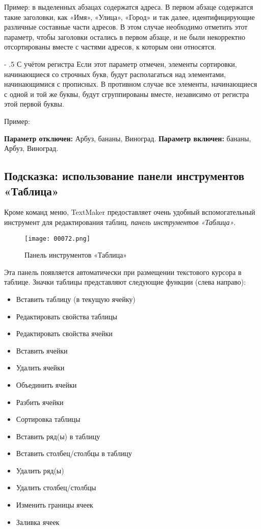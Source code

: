 ﻿\documentclass[a4paper,10pt]{article}
\makeatletter
\renewcommand\paragraph{%
   \@startsection{paragraph}{4}{0mm}%
      {-\baselineskip}%
      {.5\baselineskip}%
      {\normalfont\normalsize\bfseries}}
\makeatother
\begin{document}
Пример: в выделенных абзацах содержатся адреса. В первом абзаце содержатся такие заголовки, как «Имя», «Улица», «Город» и так далее, идентифицирующие различные составные части адресов. В этом случае необходимо отметить этот параметр, чтобы заголовки остались в первом абзаце, и не были некорректно отсортированы вместе с частями адресов, к которым они относятся.

\paragraph{С учётом регистра}
Если этот параметр отмечен, элементы сортировки, начинающиеся со строчных букв, будут располагаться над элементами, начинающимися с прописных. В противном случае все элементы, начинающиеся с одной и той же буквы, будут сгруппированы вместе, независимо от регистра этой первой буквы.

Пример:

\textbf{Параметр отключен:} Арбуз, бананы, Виноград. \textbf{Параметр включен:} бананы, Арбуз, Виноград.

\subsection{Подсказка: использование панели инструментов «Таблица»}
Кроме команд меню, TextMaker предоставляет очень удобный вспомогательный инструмент для редактирования таблиц, \textit{панель инструментов «Таблица»}.

\begin{figure}[ht]
\texttt{[image: 00072.png]}
\centering
\caption{Панель инструментов «Таблица»}
\end{figure}

Эта панель появляется автоматически при размещении текстового курсора в таблице. Значки таблицы представляют следующие функции (слева направо):

\begin{itemize}
 \item Вставить таблицу (в текущую ячейку)
 \item Редактировать свойства таблицы
 \item Редактировать свойства ячейки
 \item Вставить ячейки
 \item Удалить ячейки
 \item Объединить ячейки
 \item Разбить ячейки
 \item Сортировка таблицы
 \item Вставить ряд(ы) в таблицу
 \item Вставить столбец/столбцы в таблицу
 \item Удалить ряд(ы)
 \item Удалить столбец/столбцы
 \item Изменить границы ячеек
 \item Заливка ячеек
\end{itemize}
\end{document}
